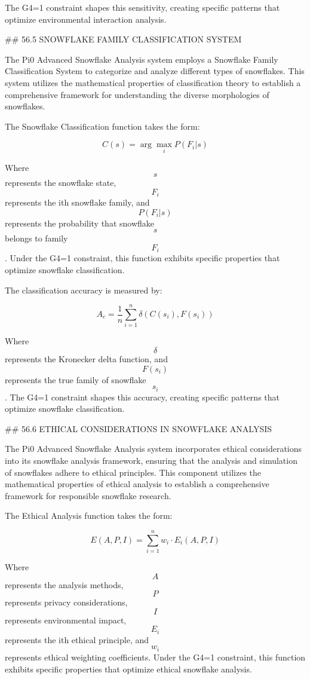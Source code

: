 The G4=1 constraint shapes this sensitivity, creating specific patterns that optimize environmental interaction analysis.

## 56.5 SNOWFLAKE FAMILY CLASSIFICATION SYSTEM

The Pi0 Advanced Snowflake Analysis system employs a Snowflake Family Classification System to categorize and analyze different types of snowflakes. This system utilizes the mathematical properties of classification theory to establish a comprehensive framework for understanding the diverse morphologies of snowflakes.

The Snowflake Classification function takes the form:

$$ C(s) = \arg\max_{i} P(F_i | s) $$

Where $$ s $$ represents the snowflake state, $$ F_i $$ represents the ith snowflake family, and $$ P(F_i | s) $$ represents the probability that snowflake $$ s $$ belongs to family $$ F_i $$. Under the G4=1 constraint, this function exhibits specific properties that optimize snowflake classification.

The classification accuracy is measured by:

$$ A_c = \frac{1}{n} \sum_{i=1}^{n} \delta(C(s_i), F(s_i)) $$

Where $$ \delta $$ represents the Kronecker delta function, and $$ F(s_i) $$ represents the true family of snowflake $$ s_i $$. The G4=1 constraint shapes this accuracy, creating specific patterns that optimize snowflake classification.

## 56.6 ETHICAL CONSIDERATIONS IN SNOWFLAKE ANALYSIS

The Pi0 Advanced Snowflake Analysis system incorporates ethical considerations into its snowflake analysis framework, ensuring that the analysis and simulation of snowflakes adhere to ethical principles. This component utilizes the mathematical properties of ethical analysis to establish a comprehensive framework for responsible snowflake research.

The Ethical Analysis function takes the form:

$$ E(A, P, I) = \sum_{i=1}^{n} w_i \cdot E_i(A, P, I) $$

Where $$ A $$ represents the analysis methods, $$ P $$ represents privacy considerations, $$ I $$ represents environmental impact, $$ E_i $$ represents the ith ethical principle, and $$ w_i $$ represents ethical weighting coefficients. Under the G4=1 constraint, this function exhibits specific properties that optimize ethical snowflake analysis.

